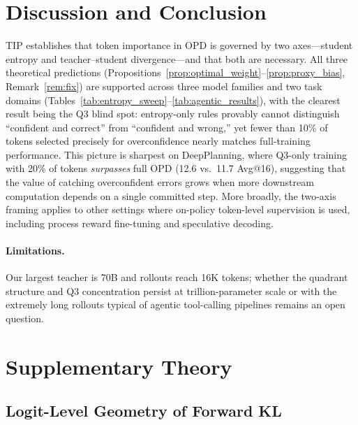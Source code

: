 \documentclass{article}
\begin{document}
\section{Discussion and Conclusion}
\label{sec:conclusion}

TIP establishes that token importance in OPD is governed by two axes---student entropy and teacher--student divergence---and that both are necessary.
All three theoretical predictions (Propositions~\ref{prop:optimal_weight}--\ref{prop:proxy_bias}, Remark~\ref{rem:fix}) are supported across three model families and two task domains (Tables~\ref{tab:entropy_sweep}--\ref{tab:agentic_results}), with the clearest result being the Q3 blind spot: entropy-only rules provably cannot distinguish ``confident and correct'' from ``confident and wrong,'' yet fewer than 10\% of tokens selected precisely for overconfidence nearly matches full-training performance.
This picture is sharpest on DeepPlanning, where Q3-only training with 20\% of tokens \emph{surpasses} full OPD (12.6 vs.\ 11.7 Avg@16), suggesting that the value of catching overconfident errors grows when more downstream computation depends on a single committed step. More broadly, the two-axis framing applies to other settings where on-policy token-level supervision is used, including process reward fine-tuning and speculative decoding.

\paragraph{Limitations.}
Our largest teacher is 70B and rollouts reach 16K tokens; whether the quadrant structure and Q3 concentration persist at trillion-parameter scale or with the extremely long rollouts typical of agentic tool-calling pipelines remains an open question.




\newpage
\appendix

\section{Supplementary Theory}
\label{app:proofs}

\subsection{Logit-Level Geometry of Forward KL}
\label{app:logit_geometry}
\end{document}
